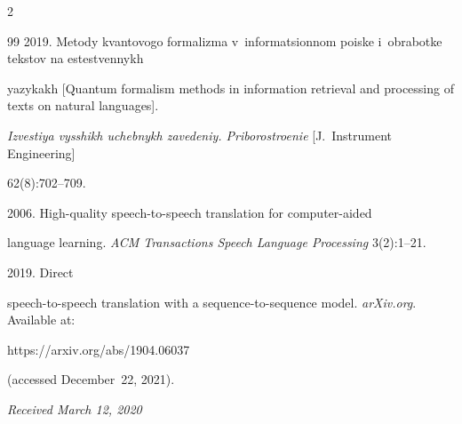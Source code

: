 \begin{multicols}{2}
{{\begin{thebibliography}{99}
2019. Metody kvantovogo formalizma v~informatsionnom poiske i~obrabotke tekstov na estestvennykh 


yazykakh [Quantum formalism methods in information retrieval and processing of texts on natural languages]. 


\textit{Izvestiya vysshikh uchebnykh zavedeniy. Priborostroenie} [J.~Instrument Engineering]  


62(8):702--709.




 2006. High-quality speech-to-speech translation for computer-aided 


language learning. \textit{ACM Transactions Speech Language Processing} 3(2):1--21.




 2019. Direct 


speech-to-speech translation with a sequence-to-sequence model. \textit{arXiv.org}. Available at: {\sf 


https://arxiv.org/abs/1904.06037} (accessed December~22, 2021).


\end{thebibliography}





 }


 }





\end{multicols}





\vspace*{-12pt}





\hfill{\small\textit{Received March 12, 2020}}





\pagebreak










\Contr





